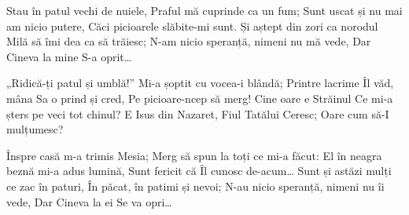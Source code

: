 \beginverse
Stau în patul vechi de nuiele,
Praful mă cuprinde ca un fum;
Sunt uscat și nu mai am nicio putere,
Căci picioarele slăbite-mi sunt.
Și aștept din zori ca norodul
Milă să îmi dea ca să trăiesc;
N-am nicio speranță, nimeni nu mă vede,
Dar Cineva la mine S-a oprit…
\endverse

\beginchorus
„Ridică-ți patul și umblă!”
Mi-a șoptit cu vocea-i blândă;
Printre lacrime Îl văd, mâna Sa o prind și cred,
Pe picioare-ncep să merg!
Cine oare e Străinul
Ce mi-a șters pe veci tot chinul?
E Isus din Nazaret, Fiul Tatălui Ceresc;
Oare cum să-I mulțumesc?
\endchorus

\beginverse
Înspre casă m-a trimis Mesia;
Merg să spun la toți ce mi-a făcut:
El în neagra beznă mi-a adus lumină,
Sunt fericit că Îl cunosc de-acum…
Sunt și astăzi mulți ce zac în paturi,
În păcat, în patimi și nevoi;
N-au nicio speranță, nimeni nu îi vede,
Dar Cineva la ei Se va opri…
\endverse
\endsong